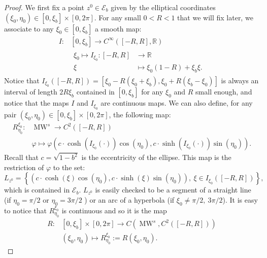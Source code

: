 \documentclass{amsart}
\theoremstyle{definition}
\theoremstyle{remark}
\numberwithin{equation}{section}
\theoremstyle{definition}
\theoremstyle{remark}
\DeclareMathOperator\MW{MW}
\begin{document}
\begin{proof}
	We first fix a point $z^0\in\mathcal{E}_{b}$ given by the elliptical coordinates $\left(\xi_0,\eta_0\right)\in[0,\xi_b]\times [0,2\pi]$. For any small $0<R<1$ that we will fix later, we associate to any $\xi_0\in[0,\xi_b]$ a smooth map: 
    \begin{equation}
       \begin{aligned}
          I: &[0,\xi_b]\rightarrow C^\infty\left([-R,R],\mathbb{R}\right)\\
           &\begin{aligned}\xi_0\mapsto 
              I_{\xi_0}: [-R,R]&\rightarrow\mathbb{R}\\
              \xi&\mapsto \xi_0\left(1-R\right)+\xi_b\xi.
           \end{aligned}
       \end{aligned}
   \end{equation}Notice that $I_{\xi_0}\left([-R,R]\right)=\left[\xi_0-R\left(\xi_0+\xi_b\right),\xi_0+R\left(\xi_b-\xi_0\right)\right]$ is always an interval of length $2R\xi_b$ contained in $[0,\xi_b]$ for any $\xi_0$ and $R$ small enough, and notice that the maps $I$ and $I_{\xi_0}$ are continuous maps. We can also define, for any pair $\left(\xi_0,\eta_0\right)\in[0,\xi_b]\times[0,2\pi]$, the following  map: \begin{equation}
       \begin{aligned}
           R_{\eta_0}^{\xi_0}:&\MW^s\rightarrow C^2\left([-R,R]\right)\\&\varphi\mapsto\varphi\left(c\cdot\cosh\left(I_{\xi_0}\left(\cdot\right)\right)\cos(\eta_0),c\cdot\sinh\left(I_{\xi_0}\left(\cdot\right)\right)\sin(\eta_0)\right).
       \end{aligned}
   \end{equation}Recall that $c=\sqrt{1-b^2}$ is the eccentricity of the ellipse. This map is the restriction of $\varphi$ to the set: \begin{equation}
		L_{z^0}=\left\{\left(c\cdot\cosh\left(
		\xi\right)\cos\left(\eta_0\right),c\cdot\sinh\left(\xi\right)\sin\left(\eta_0\right)\right),\ \xi\in I_{\xi_0}([-R,R])\right\},
	\end{equation} which is contained in $\mathcal{E}_b$. $L_{z^0}$ is easily checked to be a segment of a straight line (if $\eta_0=\pi/2$ or $\eta_0=3\pi/2$ ) or an arc of a hyperbola (if $\xi_0\neq\pi/2,\ 3\pi/2 $). It is easy to notice that  $  R_{\eta_0}^{\xi_0}$ is continuous and so it is the map \begin{equation}
       \begin{aligned}
           R:&[0,\xi_b]\times[0,2\pi]\rightarrow C\left(\MW^s,C^2\left([-R,R]\right)\right)\\&\left(\xi_0,\eta_0\right)\mapsto R_{\eta_0}^{\xi_0}:=R(\xi_0,\eta_0).
       \end{aligned}
   \end{equation}
   

\end{proof}
\end{document}
